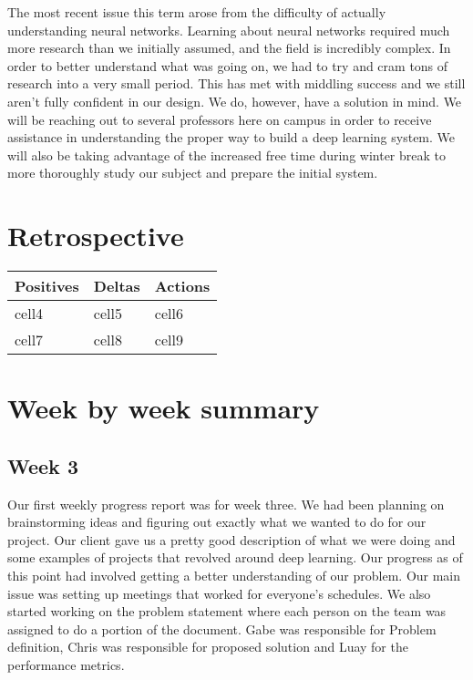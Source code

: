 \documentclass[onecolumn, draftclsnofoot,10pt, compsoc]{IEEEtran}
\begin{document}
\newline\newline
The most recent issue this term arose from the difficulty of actually understanding neural networks.
Learning about neural networks required much more research than we initially assumed, and the field is incredibly complex.
In order to better understand what was going on, we had to try and cram tons of research into a very small period.
This has met with middling success and we still aren't fully confident in our design.
We do, however, have a solution in mind. 
We will be reaching out to several professors here on campus in order to receive assistance in understanding the proper way to build a deep learning system.
We will also be taking advantage of the increased free time during winter break to more thoroughly study our subject and prepare the initial system.

\section{Retrospective}

\begin{center}
\begin{tabu} to 0.9\linewidth{ || X[l] | X[c] | X[r] || }
	\hline
	Positives & Deltas & Actions \\
	\hline\hline
	cell4 & cell5 & cell6 \\
	cell7 & cell8 & cell9 \\
	\hline
\end{tabu}
\end{center}

\section{Week by week summary}

\subsection{Week 3}
Our first weekly progress report was for week three.
We had been planning on brainstorming ideas and figuring out exactly what we wanted to do for our project.
Our client gave us a pretty good description of what we were doing and some examples of projects that revolved around deep learning.
Our progress as of this point had involved getting a better understanding of our problem.
Our main issue was setting up meetings that worked for everyone's schedules.
We also started working on the problem statement where each person on the team was assigned to do a portion of the document.
Gabe was responsible for Problem definition, Chris was responsible for proposed solution and Luay for the performance metrics.
\end{document}
